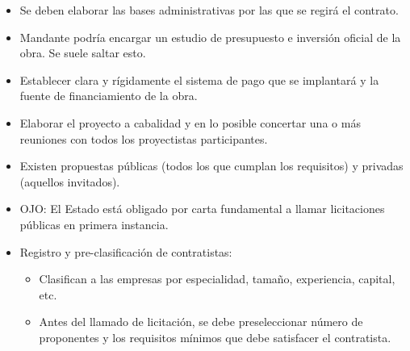 \documentclass{article} %
\begin{document}
\begin{itemize}[label={},left=0pt,align=parleft]
\begin{itemize}[label={},left=1em,align=parleft]
        \item \begin{highlightbox}[leveltwo] Se deben elaborar las bases administrativas por las que se regirá el contrato. \end{highlightbox}
        \item \begin{highlightbox}[leveltwo] Mandante podría encargar un estudio de presupuesto e inversión oficial de la obra. Se suele saltar esto. \end{highlightbox}
        \item \begin{highlightbox}[leveltwo] Establecer clara y rígidamente el sistema de pago que se implantará y la fuente de financiamiento de la obra. \end{highlightbox}
        \item \begin{highlightbox}[leveltwo] Elaborar el proyecto a cabalidad y en lo posible concertar una o más reuniones con todos los proyectistas participantes. \end{highlightbox}
        \item \begin{highlightbox}[leveltwo] Existen propuestas públicas (todos los que cumplan los requisitos) y privadas (aquellos invitados). \end{highlightbox}
        \item \begin{highlightbox}[leveltwo] OJO: El Estado está obligado por carta fundamental a llamar licitaciones públicas en primera instancia. \end{highlightbox}
        \item \begin{highlightbox}[leveltwo] Registro y pre-clasificación de contratistas: \end{highlightbox}
        \begin{itemize}[label={},left=2em,align=parleft]
            \item \begin{highlightbox}[levelthree] Clasifican a las empresas por especialidad, tamaño, experiencia, capital, etc. \end{highlightbox}
            \item \begin{highlightbox}[levelthree] Antes del llamado de licitación, se debe preseleccionar número de proponentes y los requisitos mínimos que debe satisfacer el contratista. \end{highlightbox}

\end{itemize}
\end{itemize}
\end{itemize}
\end{document}
